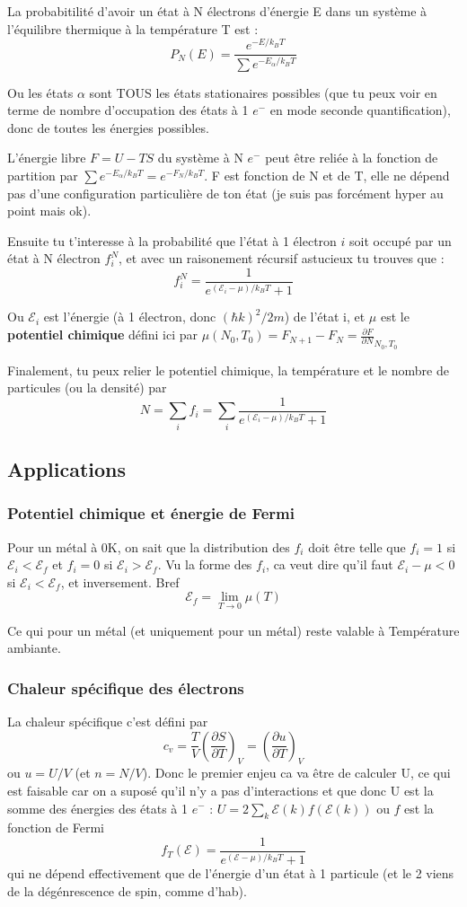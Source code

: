 \documentclass[a4paper]{report}
\begin{document}
 La probabitilité d'avoir un état à N électrons d'énergie E dans un système à l'équilibre thermique à la température T est : $$P_N(E) = \frac{e^{-E/k_BT}}{\sum e^{-E_\alpha/k_BT}}$$
 
 Ou les états $\alpha$ sont TOUS les états stationaires possibles (que tu peux voir en terme de nombre d'occupation des états à 1 $e^-$ en mode seconde quantification), donc de toutes les énergies possibles.
 
 L'énergie libre $F=U-TS$ du système à N $e^-$ peut être reliée à la fonction de partition par $\sum e^{-E_\alpha/k_BT} = e^{-F_N/k_BT}$. F est fonction de N et de T, elle ne dépend pas d'une configuration particulière de ton état (je suis pas forcément hyper au point mais ok).
 
 Ensuite tu t'interesse à la probabilité que l'état à 1 électron $i$ soit occupé par un état à N électron $f_i^N$, et avec un raisonement récursif astucieux tu trouves que : $$f_i^N=\frac{1}{e^{(\mathcal{E}_i-\mu)/k_BT}+1}$$
 
 Ou $\mathcal{E}_i$ est l'énergie (à 1 électron, donc $(\hbar k)^2/2m$) de l'état i, et $\mu$ est le \textbf{potentiel chimique} défini ici par $\mu(N_0,T_0)=F_{N+1}-F_{N}=\frac{\partial F}{\partial N}_{N_0,T_0}$
   
   Finalement, tu peux relier le potentiel chimique, la température et le nombre de particules (ou la densité) par $$ N=\sum_i f_i =\sum_i \frac{1}{e^{(\mathcal{E}_i-\mu)/k_BT}+1} $$
   
   \subsection{Applications}
   
   \subsubsection{Potentiel chimique et énergie de Fermi}
   Pour un métal à 0K, on sait que la distribution des $f_i$ doit être telle que $f_i=1$ si $\mathcal{E}_i < \mathcal{E}_f$ et $f_i=0$ si $\mathcal{E}_i > \mathcal{E}_f$. Vu la forme des $f_i$, ca veut dire qu'il faut $\mathcal{E}_i-\mu < 0$ si $\mathcal{E}_i < \mathcal{E}_f$, et inversement. Bref $$\mathcal{E}_f = \lim_{T \to 0} \mu(T)$$
   
   Ce qui pour un métal (et uniquement pour un métal) reste valable à Température ambiante.

  \subsubsection{Chaleur spécifique des électrons}
  La chaleur spécifique c'est défini par $$c_v=\frac{T}{V}\left(\frac{\partial S}{\partial T}\right)_V = \left(\frac{\partial u}{\partial T}\right)_V$$
  ou $u=U/V$ (et $n=N/V$). Donc le premier enjeu ca va être de calculer U, ce qui est faisable car on a suposé qu'il n'y a pas d'interactions et que donc U est la somme des énergies des états à 1 $e^-$ : $U=2\sum_k \mathcal{E}(k) f(\mathcal{E}(k))$ ou $f$ est la fonction de Fermi $$f_T(\mathcal{E})=\frac{1}{e^{(\mathcal{E}-\mu)/k_BT}+1}$$ qui ne dépend effectivement que de l'énergie d'un état à 1 particule (et le 2 viens de la dégénrescence de spin, comme d'hab).
  
\end{document}
